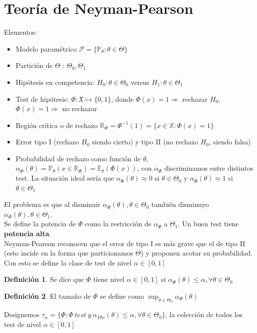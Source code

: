 \documentclass[10pt]{article}
\theoremstyle{plain}
\theoremstyle{definition}
\newtheorem{defi}{Definición}
\begin{document}
\section{Teoría de Neyman-Pearson}
Elementos:
\begin{itemize}
\item Modelo paramétrico $\mathcal{P} = \{\mathbb{P}_{\theta}\colon \theta \in \Theta\}$
\item Partición de $\Theta$ : $\Theta_{0},\Theta_{1}$
\item Hipótesis en competencia: $H_{0}: \theta \in \Theta_{0}$ versus $H_{1}: \theta \in \Theta_{1}$
\item Test de hipótesis: $\Phi: \mathfrak{X} \mapsto \{0,1\}$, donde $\Phi(x) = 1\Rightarrow$ rechazar $H_{0}$, $\Phi(x) = 1\Rightarrow$ no rechazar
\item Región crítica o de rechazo $\mathbb{R}_{\Phi} = \Phi^{-1}(1) = \{x \in \mathbb{X}\colon \Phi(x) = 1\}$
\item Error tipo I (rechazo $H_{0}$ siendo cierto) y tipo II (no rechazo $H_{0}$, siendo falsa)
\item Probabilidad de rechazo como función de $\theta$, $\alpha_{\Phi}(\theta) = \mathbb{P}_{\theta}(x \in \mathbb{R}_{\Phi}) = \mathbb{E}_{\theta}(\Phi(x))$, con $\alpha_{\Phi}$ discriminamos entre distintos test. La situación ideal sería que $\alpha_{\Phi}(\theta) \approx 0$ si $\theta \in \Theta_{0}$ y $\alpha_{\Phi}(\theta) \approx 1$ si $\theta \in \Theta_{1}$
\end{itemize}
El problema es que al disminuir $\alpha_{\Phi}(\theta), \theta \in \Theta_{0}$ también disminuyo $\alpha_{\Phi}(\theta), \theta \in \Theta_{1}$.\\

Se define la potencia de $\Phi$ como la restricción de $\alpha_{\Phi}$ a $\Theta_{1}$. Un buen test tiene \textbf{potencia alta}.\\

Neyman-Pearson reconocen que el error de tipo I es más grave que el de tipo II (esto incide en la forma que particionamos $\Theta$) y proponen acotar su probabilidad.\\
Con esto se define la clase de test de nivel $\alpha \in [0,1]$
\begin{defi} Se dice que $\Phi$ tiene nivel $\alpha \in [0,1]$ si $\alpha_{\Phi}(\theta) \le \alpha, \forall \theta \in \Theta_{0}$
\end{defi}
\begin{defi} El tamaño de $\Phi$ se define como $\sup_{\theta \in \Theta_{0}} \alpha_{\Phi}(\theta)$
\end{defi}
Designemos $\tau_{\alpha} = \{\Phi\colon \Phi\ test\ y\ \alpha_{Phi}(\theta) \le \alpha, \forall \theta \in \Theta_{0}\}$, la colección de todos los test de nivel $\alpha \in [0,1]$
\end{document}
